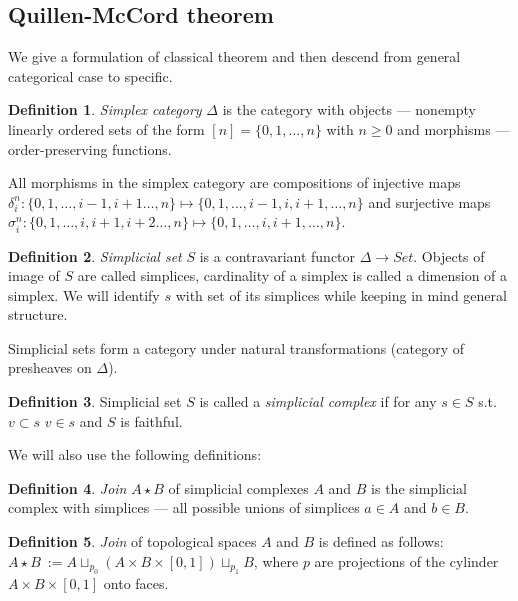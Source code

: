 \documentclass[a4paper, 12pt]{article}
\theoremstyle{definition}
\newtheorem{definition}{Definition}
\theoremstyle{remark}
\newcommand{\define}[1]{{\textit{#1}}}
\renewcommand{\geq}{\geqslant}
\begin{document}
\subsection{Quillen-McCord theorem}

We give a formulation of classical theorem and then descend from general categorical case to specific.\\

\begin{definition}
  \define{Simplex category} $\Delta$ is the category with objects --- nonempty linearly ordered sets of the form $[n] = \{0,1,\ldots,n\}$ with $n \geq 0$ and morphisms --- order-preserving functions.
\end{definition}

All morphisms in the simplex category are compositions of injective maps $\delta_i^n : \{0,1,\ldots,i-1,i+1\ldots,n\} \mapsto \{0,1,\ldots,i-1,i,i+1,\ldots,n\}$ and surjective maps $\sigma^n_i : \{0,1,\ldots,i,i+1,i+2\ldots,n\} \mapsto \{0,1,\ldots,i,i+1,\ldots,n\}$.

\begin{definition}
  \define{Simplicial set} $S$ is a contravariant functor $\Delta \to Set$. Objects of image of $S$ are called simplices, cardinality of a simplex is called a dimension of a simplex. We will identify $s$ with set of its simplices while keeping in mind general structure.
\end{definition}

Simplicial sets form a category under natural transformations (category of presheaves on $\Delta$).\\

\begin{definition}
  Simplicial set $S$ is called a \define{simplicial complex} if for any $s \in S$ s.t. $v \subset s$  $v \in s$ and $S$ is faithful.
\end{definition}

We will also use the following definitions:

\begin{definition}
  \define{Join} $A \star B$ of simplicial complexes $A$ and $B$ is the simplicial complex with simplices --- all possible unions of simplices $a \in A$ and $b \in B$.
\end{definition}

\begin{definition}
  \define{Join} of topological spaces $A$ and $B$ is defined as follows: $A \star B\ := A \sqcup_{p_0} (A \times B \times [0,1]) \sqcup_{p_1} B$, where $p$ are projections of the cylinder $A \times B \times [0,1]$ onto faces.
\end{definition}
\end{document}
